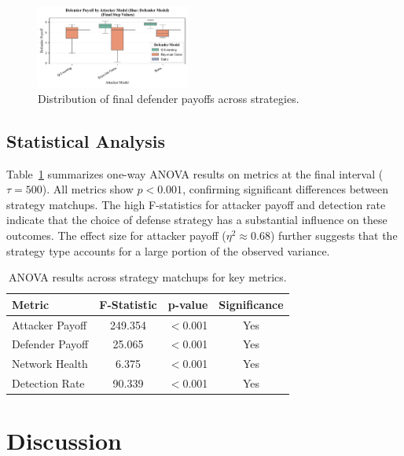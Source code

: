\documentclass[conference]{IEEEtran}
\begin{document}
\begin{figure}[htbp]
  \centering
  \includegraphics[width=0.45\textwidth]{fig_def_payoff_boxplot.pdf}
  \caption{Distribution of final defender payoffs across strategies.}
  \label{fig:def_box}   
\end{figure}

\subsection{Statistical Analysis}
Table~\ref{tab:anova} summarizes one-way ANOVA results on metrics at the final interval ($\tau=500$). All metrics show $p<0.001$, confirming significant differences between strategy matchups. The high F-statistics for attacker payoff and detection rate indicate that the choice of defense strategy has a substantial influence on these outcomes. The effect size for attacker payoff ($\eta^2 \approx 0.68$) further suggests that the strategy type accounts for a large portion of the observed variance.

\begin{table}[htbp]
  \centering
  \caption{ANOVA results across strategy matchups for key metrics.}
  \label{tab:anova}
  \begin{tabular}{lccc}
    \toprule
    \textbf{Metric} & \textbf{F-Statistic} & \textbf{p-value} & \textbf{Significance} \\
    \midrule
    Attacker Payoff & 249.354 & $<$0.001 & Yes \\
    Defender Payoff & 25.065  & $<$0.001 & Yes \\
    Network Health  & 6.375   & $<$0.001 & Yes \\
    Detection Rate  & 90.339  & $<$0.001 & Yes \\
    \bottomrule
  \end{tabular}
\end{table}

\section{Discussion}
\end{document}
